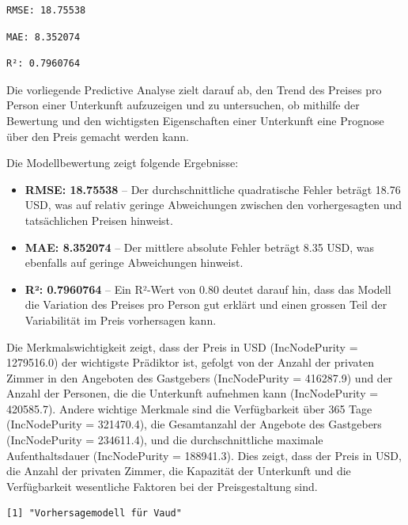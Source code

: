 \documentclass[
  journal,
]{IEEEtran}%
\begin{document}
\begin{verbatim}
RMSE: 18.75538 
\end{verbatim}

\begin{verbatim}
MAE: 8.352074 
\end{verbatim}

\begin{verbatim}
R²: 0.7960764 
\end{verbatim}

Die vorliegende Predictive Analyse zielt darauf ab, den Trend des
Preises pro Person einer Unterkunft aufzuzeigen und zu untersuchen, ob
mithilfe der Bewertung und den wichtigsten Eigenschaften einer
Unterkunft eine Prognose über den Preis gemacht werden kann.

Die Modellbewertung zeigt folgende Ergebnisse:

\begin{itemize}
\item
  \textbf{RMSE: 18.75538} -- Der durchschnittliche quadratische Fehler
  beträgt 18.76 USD, was auf relativ geringe Abweichungen zwischen den
  vorhergesagten und tatsächlichen Preisen hinweist.
\item
  \textbf{MAE: 8.352074} -- Der mittlere absolute Fehler beträgt 8.35
  USD, was ebenfalls auf geringe Abweichungen hinweist.
\item
  \textbf{R²: 0.7960764} -- Ein R²-Wert von 0.80 deutet darauf hin, dass
  das Modell die Variation des Preises pro Person gut erklärt und einen
  grossen Teil der Variabilität im Preis vorhersagen kann.
\end{itemize}

Die Merkmalswichtigkeit zeigt, dass der Preis in USD (IncNodePurity =
1279516.0) der wichtigste Prädiktor ist, gefolgt von der Anzahl der
privaten Zimmer in den Angeboten des Gastgebers (IncNodePurity =
416287.9) und der Anzahl der Personen, die die Unterkunft aufnehmen kann
(IncNodePurity = 420585.7). Andere wichtige Merkmale sind die
Verfügbarkeit über 365 Tage (IncNodePurity = 321470.4), die Gesamtanzahl
der Angebote des Gastgebers (IncNodePurity = 234611.4), und die
durchschnittliche maximale Aufenthaltsdauer (IncNodePurity = 188941.3).
Dies zeigt, dass der Preis in USD, die Anzahl der privaten Zimmer, die
Kapazität der Unterkunft und die Verfügbarkeit wesentliche Faktoren bei
der Preisgestaltung sind.

\begin{verbatim}
[1] "Vorhersagemodell für Vaud"
\end{verbatim}
\end{document}
